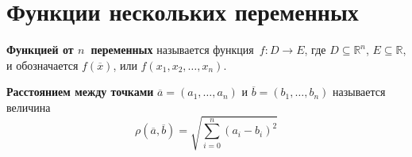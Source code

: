 \section{Функции нескольких переменных}
 \textbf{Функцией от $n$~переменных} называется функция~$f \colon D \to E$, где $D \subseteq \mathbb R^n$, $E \subseteq \mathbb R$, и обозначается $f(\overline x)$, или $f(x_1, x_2, \ldots, x_n)$.

 \textbf{Расстоянием между точками} $\overline a = (a_1, \ldots, a_n)$ и $\overline b = (b_1, \ldots, b_n)$ называется величина
\begin{equation*}
\rho(\overline a, \overline b) = \sqrt{\sum_{i=0}^n (a_i - b_i)^2}
\end{equation*}